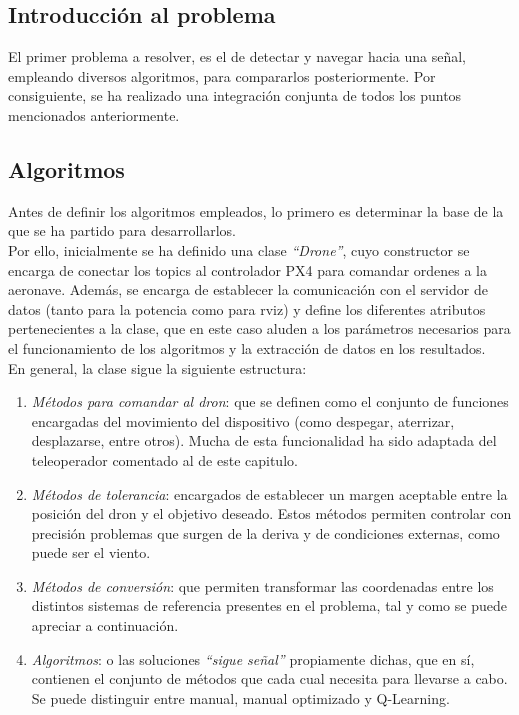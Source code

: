 \subsection{Introducción al problema}
\label{subsec:intro_sf}

El primer problema a resolver, es el de detectar y navegar hacia una señal, empleando diversos algoritmos, para compararlos posteriormente. Por consiguiente, se ha realizado una integración conjunta de todos los puntos mencionados anteriormente.\\

\subsection{Algoritmos}
\label{subsec:algoritmo_sf}

Antes de definir los algoritmos empleados, lo primero es determinar la base de la que se ha partido para desarrollarlos.\\

Por ello, inicialmente se ha definido una clase \emph{``Drone''}, cuyo constructor se encarga de conectar los topics al controlador PX4 para comandar ordenes a la aeronave. Además, se encarga de establecer la comunicación con el servidor de datos (tanto para la potencia como para rviz) y define los diferentes atributos pertenecientes a la clase, que en este caso aluden a los parámetros necesarios para el funcionamiento de los algoritmos y la extracción de datos en los resultados.\\

En general, la clase sigue la siguiente estructura:

\begin{enumerate}
	\item \emph{Métodos para comandar al dron}: que se definen como el conjunto de funciones encargadas del movimiento del dispositivo (como despegar, aterrizar, desplazarse, entre otros). Mucha de esta funcionalidad ha sido adaptada del teleoperador comentado al de este capitulo.

    \item \emph{Métodos de tolerancia}: encargados de establecer un margen aceptable entre la posición del dron y el objetivo deseado. Estos métodos permiten controlar con precisión problemas que surgen de la deriva y de condiciones externas, como puede ser el viento.

	\item \emph{Métodos de conversión}: que permiten transformar las coordenadas entre los distintos sistemas de referencia presentes en el problema, tal y como se puede apreciar a continuación.

    \item \emph{Algoritmos}: o las soluciones \emph{``sigue señal''} propiamente dichas, que en sí, contienen el conjunto de métodos que cada cual necesita para llevarse a cabo. Se puede distinguir entre manual, manual optimizado y Q-Learning.
\end{enumerate}

